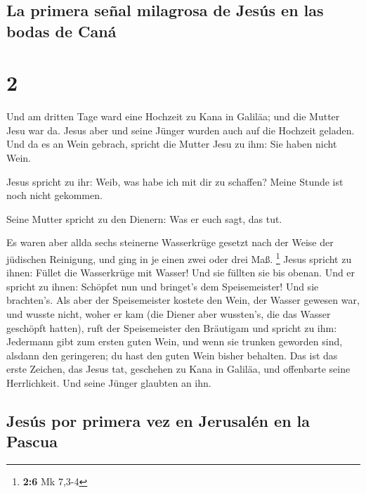 \hypertarget{la-primera-seuxf1al-milagrosa-de-jesuxfas-en-las-bodas-de-canuxe1}{%
\subsection{La primera señal milagrosa de Jesús en las bodas de
Caná}\label{la-primera-seuxf1al-milagrosa-de-jesuxfas-en-las-bodas-de-canuxe1}}

\hypertarget{section-1}{%
\section{2}\label{section-1}}

 Und am dritten Tage ward eine Hochzeit zu Kana in
Galiläa; und die Mutter Jesu war da.  Jesus aber und seine
Jünger wurden auch auf die Hochzeit geladen.  Und da es an
Wein gebrach, spricht die Mutter Jesu zu ihm: Sie haben nicht Wein.

 Jesus spricht zu ihr: Weib, was habe ich mit dir zu
schaffen? Meine Stunde ist noch nicht gekommen.

 Seine Mutter spricht zu den Dienern: Was er euch sagt,
das tut.

 Es waren aber allda sechs steinerne Wasserkrüge gesetzt
nach der Weise der jüdischen Reinigung, und ging in je einen zwei oder
drei Maß. \footnote{\textbf{2:6} Mk 7,3-4}  Jesus spricht
zu ihnen: Füllet die Wasserkrüge mit Wasser! Und sie füllten sie bis
obenan.  Und er spricht zu ihnen: Schöpfet nun und
bringet's dem Speisemeister! Und sie brachten's.  Als aber
der Speisemeister kostete den Wein, der Wasser gewesen war, und wusste
nicht, woher er kam (die Diener aber wussten's, die das Wasser geschöpft
hatten), ruft der Speisemeister den Bräutigam  und
spricht zu ihm: Jedermann gibt zum ersten guten Wein, und wenn sie
trunken geworden sind, alsdann den geringeren; du hast den guten Wein
bisher behalten.  Das ist das erste Zeichen, das Jesus
tat, geschehen zu Kana in Galiläa, und offenbarte seine Herrlichkeit.
Und seine Jünger glaubten an ihn.

\hypertarget{jesuxfas-por-primera-vez-en-jerusaluxe9n-en-la-pascua}{%
\subsection{Jesús por primera vez en Jerusalén en la
Pascua}\label{jesuxfas-por-primera-vez-en-jerusaluxe9n-en-la-pascua}}

